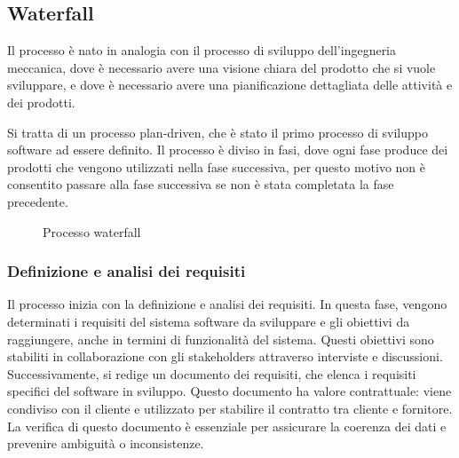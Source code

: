 \subsection{Waterfall}
Il processo è nato in analogia con il processo di sviluppo dell'ingegneria
meccanica, dove è necessario avere una visione chiara del prodotto che si vuole
sviluppare, e dove è necessario avere una pianificazione dettagliata delle attività
e dei prodotti.

Si tratta di un processo plan-driven, che è stato il primo processo di sviluppo
software ad essere definito. Il processo è diviso in fasi, dove ogni fase
produce dei prodotti che vengono utilizzati nella fase successiva, per questo motivo non 
è consentito passare alla fase successiva se non è stata completata la fase precedente.

\begin{figure}[H]
    \centering
    \caption{Processo waterfall}
\end{figure}
\subsubsection{Definizione e analisi dei requisiti} 
Il processo inizia con la definizione e analisi dei requisiti. In questa fase,
vengono determinati i requisiti del sistema software da sviluppare e gli obiettivi
da raggiungere, anche in termini di funzionalità del sistema. Questi obiettivi sono
stabiliti in collaborazione con gli stakeholders attraverso interviste e discussioni.
Successivamente, si redige un documento dei requisiti, che elenca i requisiti specifici
del software in sviluppo. Questo documento ha valore contrattuale: viene condiviso con
il cliente e utilizzato per stabilire il contratto tra cliente e fornitore. La
verifica di questo documento è essenziale
per assicurare la coerenza dei dati e prevenire ambiguità o inconsistenze.
